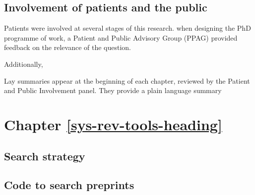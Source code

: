 \documentclass[a4paper, twoside]{templates/ociamthesis}
\begin{document}
\hypertarget{appendix-ppi}{%
\subsection{Involvement of patients and the public}\label{appendix-ppi}}

Patients were involved at several stages of this research. when designing the PhD programme of work, a Patient and Public Advisory Group (PPAG) provided feedback on the relevance of the question.

Additionally,

Lay summaries appear at the beginning of each chapter, reviewed by the Patient and Public Involvement panel. They provide a plain language summary

\hypertarget{appendix-sys-rev-tools}{%
\section{Chapter \ref{sys-rev-tools-heading}}\label{appendix-sys-rev-tools}}

\hypertarget{appendix-search-strategy}{%
\subsection{Search strategy}\label{appendix-search-strategy}}

\hypertarget{appendix-medrxivr-code}{%
\subsection{Code to search preprints}\label{appendix-medrxivr-code}}
\end{document}
